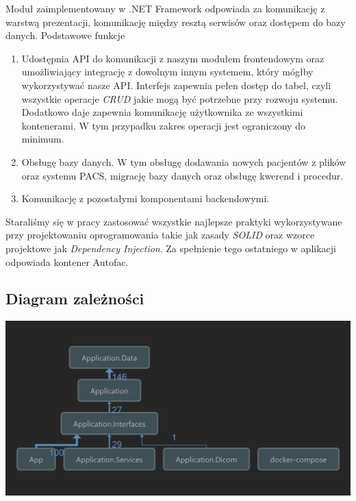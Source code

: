 \documentclass[a4paper,11pt,twoside]{report}
\theoremstyle{definition}
\begin{document}
Moduł zaimplementowany w .NET Framework odpowiada za komunikację z warstwą prezentacji, komunikację między resztą serwisów oraz dostępem do bazy danych. Podstawowe funkcje
\begin{enumerate}
\item Udostępnia API do komunikacji z naszym modułem frontendowym oraz umożliwiający integrację z dowolnym innym systemem, który mógłby wykorzystywać nasze API. Interfejs zapewnia pełen dostęp do tabel, czyli wszystkie operacje \textit{CRUD} jakie mogą być potrzebne przy rozwoju systemu. Dodatkowo daje zapewnia komunikację użytkownika ze wszystkimi kontenerami. W tym przypadku zakres operacji jest ograniczony do minimum.
\item Obsługę bazy danych. W tym obsługę dodawania nowych pacjentów z plików oraz systemu PACS, migrację bazy danych oraz obsługę kwerend i procedur.
\item Komunikację z pozostałymi komponentami backendowymi.
\end{enumerate}

Staraliśmy się w pracy zastosować wszystkie najlepsze praktyki wykorzystywane przy projektowaniu oprogramowania takie jak zasady \textit{SOLID} oraz wzorce projektowe jak \textit{Dependency Injection}. Za spełnienie tego ostatniego w aplikacji odpowiada kontener Autofac.

\subsection{Diagram zależności}
\begin{minipage}[h]{\linewidth}
	\centering
	\includegraphics[width=\textwidth]{Backend/ApplicationDependencies.png}
\end{minipage}
\end{document}
